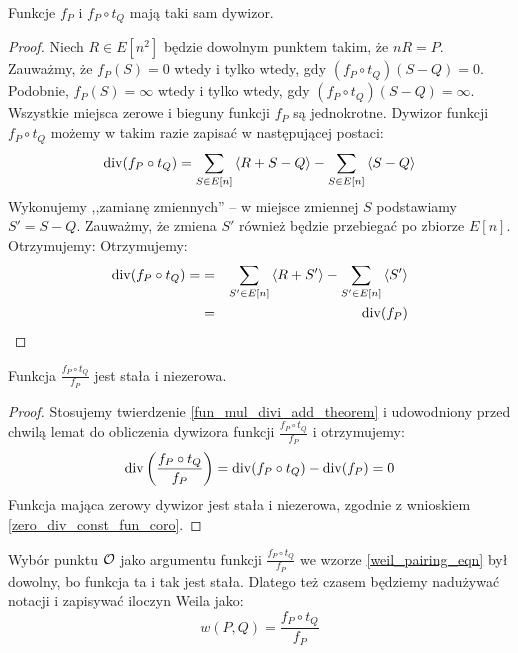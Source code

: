 \begin{lemma}\label{weil_pairing_same_divi_lemma}
Funkcje $f_P$ i $f_P \circ t_Q$ mają taki sam dywizor.
\end{lemma}

\begin{proof}
Niech $R \in E[n^2]$ będzie dowolnym punktem takim, że $nR = P$.
Zauważmy, że $f_P(S) = 0$ wtedy i tylko wtedy,
gdy $(f_P \circ t_Q)(S - Q) = 0$.
Podobnie, $f_P(S) = \infty$ wtedy i tylko wtedy,
gdy $(f_P \circ t_Q)(S - Q) = \infty$.
Wszystkie miejsca zerowe i bieguny funkcji $f_P$ są jednokrotne.
Dywizor funkcji $f_P \circ t_Q$ możemy w takim razie zapisać
w następującej postaci:
\begin{equation*}
\operatorname{div}(f_P \circ t_Q) =
\sum_{S \in E[n]} \left\langle R + S - Q\right\rangle - \sum_{S \in E[n]} \left\langle S - Q\right\rangle
\end{equation*}
Wykonujemy ,,zamianę zmiennych'' --
w miejsce zmiennej $S$ podstawiamy $S' = S - Q$.
Zauważmy, że zmiena $S'$ również będzie przebiegać po zbiorze $E[n]$.
Otrzymujemy:
Otrzymujemy:
\begin{eqnarray*}
\operatorname{div}(f_P \circ t_Q) =
& = & \sum_{S' \in E[n]} \left\langle R + S'\right\rangle - \sum_{S' \in E[n]} \left\langle S'\right\rangle \\
& = & \operatorname{div}(f_P)
\end{eqnarray*}
\end{proof}

\begin{corollary}\label{weil_pairing_fun_const_coro}
Funkcja $\frac{f_P \circ t_Q}{f_P}$ jest stała i niezerowa.
\end{corollary}

\begin{proof}
Stosujemy twierdzenie \ref{fun_mul_divi_add_theorem}
i udowodniony przed chwilą lemat
do obliczenia dywizora funkcji $\frac{f_P \circ t_Q}{f_P}$
i otrzymujemy:
\begin{equation*}
\operatorname{div}\left(\frac{f_P \circ t_Q}{f_P}\right) =
\operatorname{div}(f_P \circ t_Q) - \operatorname{div}(f_P) = 0
\end{equation*}
Funkcja mająca zerowy dywizor jest stała i niezerowa,
zgodnie z wnioskiem \ref{zero_div_const_fun_coro}.
\end{proof}

\begin{remark}
Wybór punktu $\mathcal{O}$ jako argumentu funkcji $\frac{f_P \circ t_Q}{f_P}$
we wzorze \ref{weil_pairing_eqn} był dowolny,
bo funkcja ta i tak jest stała.
Dlatego też czasem będziemy nadużywać notacji i zapisywać
iloczyn Weila jako:
\begin{equation*}
w(P, Q) = \frac{f_P \circ t_Q}{f_P}
\end{equation*}
\end{remark}


